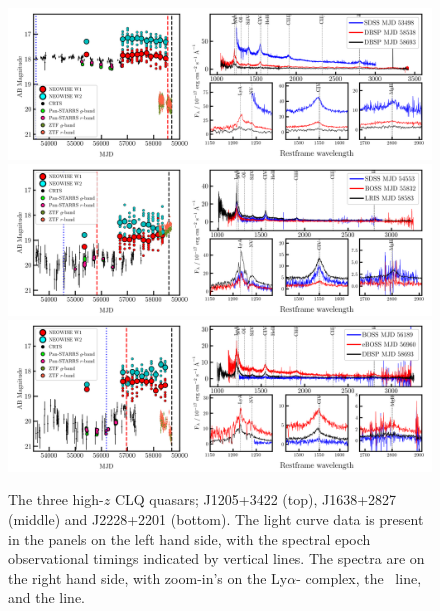 \documentclass[a4paper,fleqn,usenatbib]{mnras}
\begin{document}
\begin{figure}
  \centering
  \includegraphics[width=16.7cm, trim=0.3cm 0.05cm 0.45cm 0.1cm, clip]
  {figures/J1205+3422_landscape_20191112.png}
  \includegraphics[width=16.7cm, trim=0.3cm 0.05cm 0.40cm 0.1cm, clip]
  {figures/J1638+2827_landscape_20191112.png}
  \includegraphics[width=16.7cm, trim=0.3cm 0.0cm  0.35cm 0.1cm, clip]
  {figures/J2228+2201_landscape_20191112.png}
  \vspace{-12pt}
  \caption[]{The three high-$z$ CLQ quasars; 
    J1205+3422 (top), 
    J1638+2827 (middle) and  
    J2228+2201 (bottom). 
The light curve data is present in the panels on the left hand side, with the 
spectral epoch observational timings indicated by vertical lines. 
The spectra are on the right hand side, with zoom-in's on the Ly$\alpha$-\nv 
complex, the \civ\ line, and the \mgii line. 
  }
  \label{fig:civ_clqs}
\end{figure}
\end{document}

